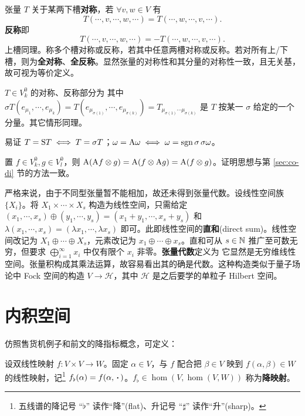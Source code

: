 \begin{definition}
    张量 $T$ 关于某两下槽\textbf{对称}，若 $\forall v,w\in V$ 有
    \[
    T(\cdots,v,\cdots,w,\cdots)=T(\cdots,w,\cdots,v,\cdots).
    \]
    \textbf{反称}即
    \[
    T(\cdots,v,\cdots,w,\cdots)=-T(\cdots,w,\cdots,v,\cdots).
    \]
    上槽同理。称多个槽对称或反称，若其中任意两槽对称或反称。若对所有上/下槽，则为\textbf{全对称}、\textbf{全反称}。显然张量的对称性和其分量的对称性一致，且无关基，故可视为等价定义。

    $T\in V^0_k$ 的对称、反称部分为
其中 $\sigma T(e_{\mu_1},\cdots,e_{\mu_k})=T(e_{\mu_{\sigma(1)}},\cdots,e_{\mu_{\sigma(k)}})=T_{\mu_{\sigma(1)}\cdots\mu_{\sigma(k)}}$ 是 $T$ 按某一 $\sigma$ 给定的一个分量。其它情形同理。
\end{definition}

\begin{theorem}
    易证 $T=\S T\iff T=\sigma T$；$\omega=\A\omega\iff\omega=\sgn\sigma\,\sigma\omega$。
\end{theorem}

\begin{theorem}
    置 $f\in V^0_k,g\in V^0_l$，则 $\A(\A f\otimes g)=\A(f\otimes\A g)=\A(f\otimes g)$。证明思想与第 \ref{sec:co-di} 节的方法一致。
\end{theorem}

严格来说，由于不同型张量暂不能相加，故还未得到张量代数。设线性空间族 $\{X_i\}$。将 $X_1\times\cdots\times X_s$ 构造为线性空间，只需给定 $(x_1,\cdots,x_s)\oplus(y_1,\cdots,y_s)=(x_1+y_1,\cdots,x_s+y_s)$ 和 $\lambda(x_1,\cdots,x_s)=(\lambda x_1,\cdots,\lambda x_s)$ 即可。此即线性空间的\textbf{直和}(direct sum)。线性空间改记为 $X_1\oplus\cdots\oplus X_s$，元素改记为 $x_1\oplus\cdots\oplus x_s$。直和可从 $s\in\N$ 推广至可数无穷，但要求 $\bigoplus_{i=1}^\infty x_i$ 中仅有限个 $x_i$ 非零。\textbf{张量代数}定义为
它显然是无穷维线性空间。张量积构成其乘法运算，故容易看出其的确是代数。这种构造类似于量子场论中 Fock 空间的构造 $V\to\mathscr H$，其中 $\mathscr H$ 是之后要学的单粒子 Hilbert 空间。

\section{内积空间}

仿照售货机例子和前文的降指标概念，可定义：

\begin{definition}
    设双线性映射 $f:V\times V\to W$。固定 $\alpha\in V$，与 $f$ 配合把 $\beta\in V$ 映到 $f(\alpha,\beta)\in W$ 的线性映射，记\footnote{五线谱的降记号 “$\flat$” 读作“降”(flat)、升记号 “$\sharp$” 读作“升”(sharp)。} $f_\flat(\alpha)=f(\alpha,\oo)$。$f_\flat\in\hom(V,\hom(V,W))$ 称为\textbf{降映射}。
\end{definition}


